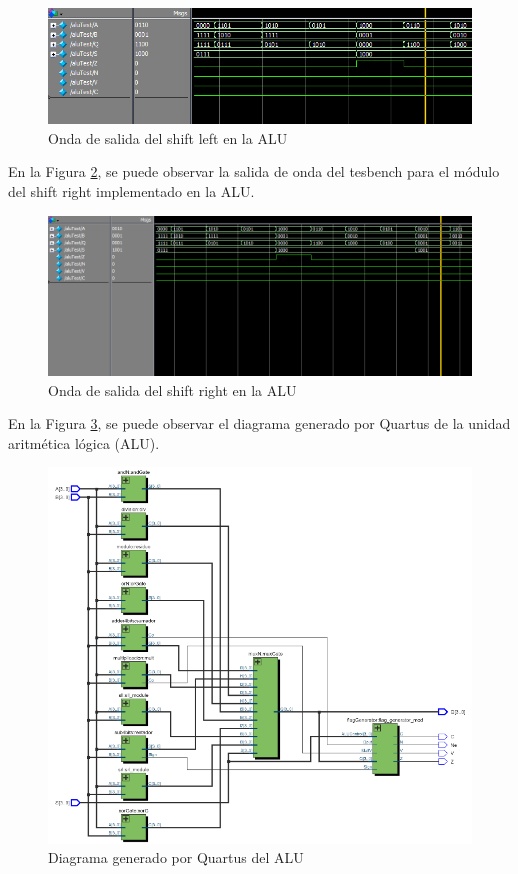 \documentclass[journal]{IEEEtran}
\begin{document}
	\begin{figure}[hbtp]
		\centering
		\includegraphics[scale = 0.4]{img/wsl.png}
		\caption{Onda de salida del shift left en la ALU}
		\label{fig:wsl}
	\end{figure}
	
	En la Figura \ref{fig:wsr}, se puede observar la salida de onda del tesbench para el módulo del shift right implementado en la ALU.
	
	\begin{figure}[hbtp]
		\centering
		\includegraphics[scale = 0.3]{img/wsr.png}
		\caption{Onda de salida del shift right en la ALU}
		\label{fig:wsr}
	\end{figure}
	
	En la Figura \ref{fig:niv31}, se puede observar el diagrama generado por Quartus de la unidad aritmética lógica (ALU).
	
	\begin{figure}[hbtp]
		\centering
		\includegraphics[scale = 0.45]{img/nivel31.png}
		\caption{Diagrama generado por Quartus del ALU}
		\label{fig:niv31}
	\end{figure}
	
\end{document}
